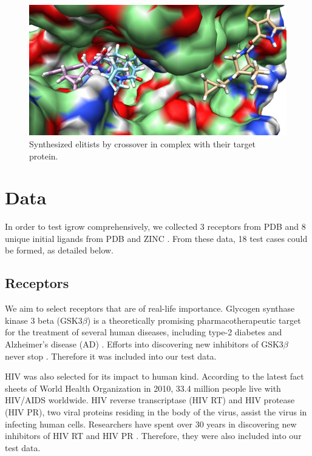 \documentclass[10pt, conference, compsocconf]{IEEEtran}
\begin{document}
\begin{figure}
\centering
\includegraphics[width=\textwidth]{../igrow/CrossoverComplex.png}
\caption{Synthesized elitists by crossover in complex with their target protein.}
\label{igrow:CrossoverComplex}
\end{figure}

\section{Data}

In order to test igrow comprehensively, we collected 3 receptors from PDB \cite{96} and 8 unique initial ligands from PDB and ZINC \cite{55}. From these data, 18 test cases could be formed, as detailed below.

\subsection{Receptors}

We aim to select receptors that are of real-life importance. Glycogen synthase kinase 3 beta (GSK3$\beta$) is a theoretically promising pharmacotherapeutic target for the treatment of several human diseases, including type-2 diabetes \cite{247} and Alzheimer's disease (AD) \cite{248}. Efforts into discovering new inhibitors of GSK3$\beta$ never stop \cite{246}. Therefore it was included into our test data.

HIV was also selected for its impact to human kind. According to the latest fact sheets of World Health Organization in 2010, 33.4 million people live with HIV/AIDS worldwide. HIV reverse transcriptase (HIV RT) and HIV protease (HIV PR), two viral proteins residing in the body of the virus, assist the virus in infecting human cells. Researchers have spent over 30 years in discovering new inhibitors of HIV RT and HIV PR \cite{221,222,223}. Therefore, they were also included into our test data.
\end{document}
